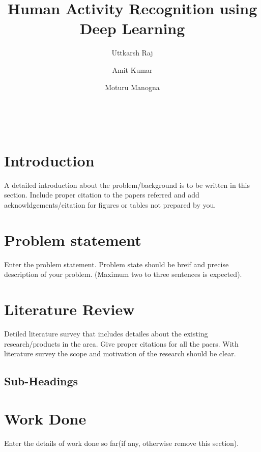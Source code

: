 \documentclass[twocolumn]{article}
\begin{document}
\title{\textbf{Human Activity Recognition using Deep Learning}}\\


\author{Uttkarsh Raj \and Amit Kumar \and Moturu Manogna}





\section{Introduction}
A detailed introduction  about the problem/background  is to be written in this section. Include proper citation to the papers referred and add acknowldgements/citation for figures or tables  not prepared by you.

\section{Problem statement}
Enter the problem statement. Problem state should be breif and precise description of your problem. (Maximum two to three sentences is  expected).

\section{Literature Review}
Detiled literature survey that includes detailes about the existing research/products in the area. Give proper citations for all the paers. With literature survey the scope and motivation of the  research should be clear. 

\subsection{Sub-Headings}

\section{Work Done}
Enter the details of work done so far(if any, otherwise remove this section).
\end{document}
